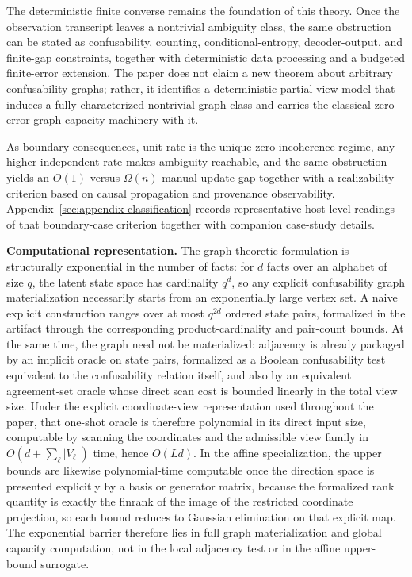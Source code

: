 The deterministic finite converse remains the foundation of this theory. Once the observation transcript leaves a nontrivial ambiguity class, the same obstruction can be stated as confusability, counting, conditional-entropy, decoder-output, and finite-gap constraints, together with deterministic data processing and a budgeted finite-error extension. The paper does not claim a new theorem about arbitrary confusability graphs; rather, it identifies a deterministic partial-view model that induces a fully characterized nontrivial graph class and carries the classical zero-error graph-capacity machinery with it.

As boundary consequences, unit rate is the unique zero-incoherence regime, any higher independent rate makes ambiguity reachable, and the same obstruction yields an $O(1)$ versus $\Omega(n)$ manual-update gap together with a realizability criterion based on causal propagation and provenance observability. Appendix~\ref{sec:appendix-classification} records representative host-level readings of that boundary-case criterion together with companion case-study details.

\textbf{Computational representation.} The graph-theoretic formulation is structurally exponential in the number of facts: for $d$ facts over an alphabet of size $q$, the latent state space has cardinality $q^d$, so any explicit confusability graph materialization necessarily starts from an exponentially large vertex set. A naive explicit construction ranges over at most $q^{2d}$ ordered state pairs, formalized in the artifact through the corresponding product-cardinality and pair-count bounds. At the same time, the graph need not be materialized: adjacency is already packaged by an implicit oracle on state pairs, formalized as a Boolean confusability test equivalent to the confusability relation itself, and also by an equivalent agreement-set oracle whose direct scan cost is bounded linearly in the total view size. Under the explicit coordinate-view representation used throughout the paper, that one-shot oracle is therefore polynomial in its direct input size, computable by scanning the coordinates and the admissible view family in $O(d+\sum_{\ell}|V_\ell|)$ time, hence $O(Ld)$. In the affine specialization, the upper bounds are likewise polynomial-time computable once the direction space is presented explicitly by a basis or generator matrix, because the formalized rank quantity is exactly the finrank of the image of the restricted coordinate projection, so each bound reduces to Gaussian elimination on that explicit map. The exponential barrier therefore lies in full graph materialization and global capacity computation, not in the local adjacency test or in the affine upper-bound surrogate.

